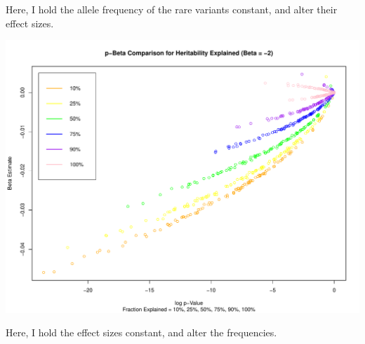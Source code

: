 \documentclass[11pt]{article} %
\begin{document}
Here, I hold the allele frequency of the rare variants constant, and alter their effect sizes.

\includegraphics[scale=0.5]{Understanding B/Constant Beta.pdf}

Here, I hold the effect sizes constant, and alter the frequencies.
\end{document}
